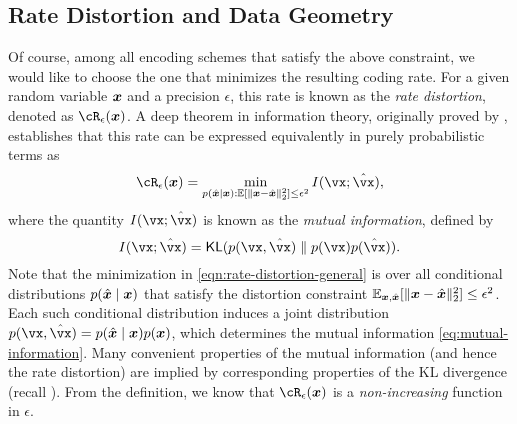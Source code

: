 \documentclass[../../book-main.tex]{subfiles}
\begin{document}
\subsection{Rate Distortion and Data Geometry}
Of course, among all encoding schemes that satisfy the above constraint, we
would like to choose the one that minimizes the resulting coding rate. For
a given random variable $\bm{x}$ and a precision $\epsilon$, this rate is known as
the {\em rate distortion}, denoted as $\cR_{\epsilon}(\x)$. 
A deep theorem in information theory, originally proved by
\textcite{shannon1959coding}, establishes that this rate can be expressed
equivalently in purely probabilistic terms as
\begin{equation}
	\cR_{\epsilon}(\x) 
	= \min_{p(\hat \x \mid \x): \Ex[\norm{\x -\hat \x}_2^{2}] \le \epsilon^{2}} 
	I(\vx; \hat{\vx}),
    \label{eqn:rate-distortion-general}
\end{equation}
where the quantity $I(\vx; \hat{\vx})$ is known as the \textit{mutual
information}, defined by
\begin{equation}\label{eq:mutual-information}
	I(\vx; \hat{\vx})
	= \KL(p(\vx, \hat{\vx}) \mmid p(\vx) p(\hat{\vx})).
\end{equation}
Note that the minimization
in \eqref{eqn:rate-distortion-general} is over all conditional distributions $p(\hat {\bm{x}} \mid \bm{x})$
that satisfy the distortion constraint $\Ex_{\x, \hat \x}[\norm{\x- \hat \x}_2^{2}] \le \epsilon^{2}$. 
Each such conditional distribution induces a joint distribution $p(\vx,
\hat{\vx}) = p(\hat\x \mid \x) p(\x)$, which determines the mutual
information \eqref{eq:mutual-information}.
Many convenient properties of the mutual information (and hence the rate
distortion) are implied by corresponding properties of the KL divergence (recall
).
From the definition, we know that $\cR_{\epsilon}(\x)$ is a {\em non-increasing}
function in $\epsilon$.
\end{document}
